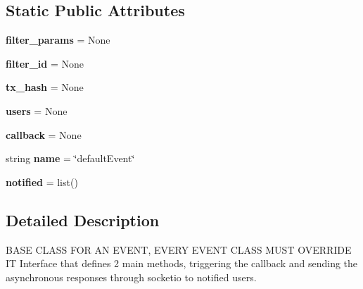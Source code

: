 \subsection*{Static Public Attributes}
\begin{DoxyCompactItemize}
\item 
\mbox{\label{classapp_1_1models_1_1events_1_1_event_a42be61eec0ffe2570f97da9b0539a0a5}} 
{\bfseries filter\+\_\+params} = None
\item 
\mbox{\label{classapp_1_1models_1_1events_1_1_event_a05262863833ebc03bafebd6db94aeb04}} 
{\bfseries filter\+\_\+id} = None
\item 
\mbox{\label{classapp_1_1models_1_1events_1_1_event_acb7cb92a35c85b6e1816a1d8c6594609}} 
{\bfseries tx\+\_\+hash} = None
\item 
\mbox{\label{classapp_1_1models_1_1events_1_1_event_af897af9dcd6e2475f27b8162f7ae0fa1}} 
{\bfseries users} = None
\item 
\mbox{\label{classapp_1_1models_1_1events_1_1_event_a1ae1300b6138ef9e56ecba7a79bbc8d1}} 
{\bfseries callback} = None
\item 
\mbox{\label{classapp_1_1models_1_1events_1_1_event_aa3b68ff9d45826386d61dad403d33501}} 
string {\bfseries name} = \char`\"{}default\+Event\char`\"{}
\item 
\mbox{\label{classapp_1_1models_1_1events_1_1_event_adc1c169fe40dc540f15f8f3aabd999b5}} 
{\bfseries notified} = list()
\end{DoxyCompactItemize}


\subsection{Detailed Description}
\begin{DoxyVerb} BASE CLASS FOR AN EVENT, EVERY EVENT CLASS MUST OVERRIDE IT
 Interface that defines 2 main methods, triggering the callback and sending the asynchronous responses through socketio to notified users.
\end{DoxyVerb}
 

